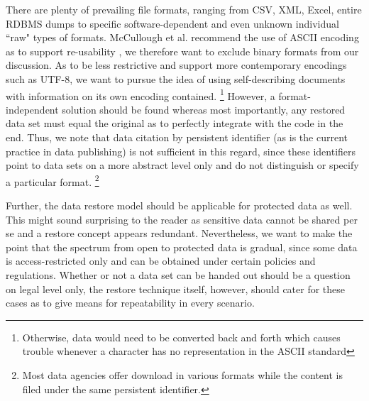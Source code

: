 \documentclass{acm_proc_article-sp}
\begin{document}
There are plenty of prevailing file formats, ranging from CSV, XML, Excel, entire RDBMS dumps to specific software-dependent and even unknown individual ``raw" types of formats.
McCullough et al. recommend the use of ASCII encoding as to support re-usability \cite{RePEc_ejw_journl_v_4_y_2007_i_3_p_326_337}, we therefore want to exclude binary formats from our discussion.
As to be less restrictive and support more contemporary encodings such as UTF-8, we want to pursue the idea of using self-describing documents with information on its own encoding contained.
\footnote{Otherwise, data would need to be converted back and forth which causes trouble whenever a character has no representation in the ASCII standard}
However, a format-independent solution should be found whereas most importantly, any restored data set must equal the original as to perfectly integrate with the code in the end. 
Thus, we note that data citation by persistent identifier (as is the current practice in data publishing) is not sufficient in this regard, since these identifiers point to data sets on a more abstract level only and do not distinguish or specify a particular format.
\footnote{Most data agencies offer download in various formats while the content is filed under the same persistent identifier.}

  
Further, the data restore model should be applicable for protected data as well.
This might sound surprising to the reader as sensitive data cannot be shared per se and a restore concept appears redundant.
Nevertheless, we want to make the point that the spectrum from open to protected data is gradual, since some data is access-restricted only and can be obtained under certain policies and regulations.
Whether or not a data set can be handed out should be a question on legal level only, the restore technique itself, however, should cater for these cases as to give means for repeatability in every scenario.
\end{document}
